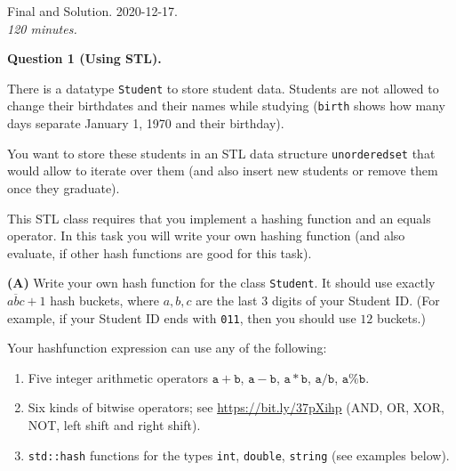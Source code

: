\documentclass[a4paper,12pt]{article}
\begin{document}
\thispagestyle{empty}

\twocolumn

\begin{center}
{\Large Final and Solution. 2020-12-17.}\\
{\em 120 minutes.} 
\end{center}


% 
\vspace{10pt}
{\bf Question 1 (Using STL).} 




There is a datatype {\tt Student} to store student data. 
Students are not allowed to change their
birthdates and their names while studying ({\tt birth} shows 
how many days separate January 1, 1970 and their birthday).

\vspace{5pt}
You want to store these students in an STL 
data structure {\tt unordered\textunderscore{}set} 
that would allow to iterate over them (and also insert new students
or remove them once they graduate). 

This STL class requires that you implement a hashing function and
an equals operator.
In this task you will write your own hashing function
(and also evaluate, if other hash functions are good for this task).

\vspace{5pt}
{\bf (A)} Write your own hash function for the class {\tt Student}. 
It should use exactly $\overline{abc}+1$ hash buckets, 
where $a,b,c$ are the last $3$ digits of your Student ID. 
(For example, if your Student ID ends with {\tt 011}, then 
you should use $12$ buckets.)

Your hashfunction expression can use any of the following: 
\begin{enumerate}
\item Five integer arithmetic operators $\mathtt{a+b}$, $\mathtt{a-b}$, 
$\mathtt{a \ast b}$, $\mathtt{a/b}$, $\mathtt{a\%b}$. 
\item Six kinds of bitwise operators;  
see \url{https://bit.ly/37pXihp} (AND, OR, XOR, NOT, left shift and
right shift). 
\item {\tt std::hash} functions for the types {\tt int}, 
{\tt double}, {\tt string} (see examples below).
\end{enumerate}
\end{document}
